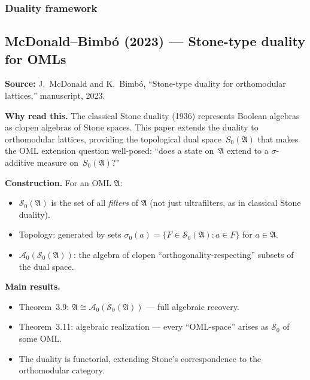 \subsubsection{Duality framework}

\subsection*{McDonald--Bimb\'{o} (2023) --- Stone-type duality for OMLs}

\textbf{Source:} J.\ McDonald and K.\ Bimb\'{o}, ``Stone-type duality
for orthomodular lattices,'' manuscript, 2023.

\textbf{Why read this.}  The classical Stone duality (1936) represents
Boolean algebras as clopen algebras of Stone spaces.  This paper extends
the duality to orthomodular lattices, providing the topological dual
space~$S_0(\mathfrak{A})$ that makes the OML extension question
well-posed: ``does a state on~$\mathfrak{A}$ extend to a
$\sigma$-additive measure on~$S_0(\mathfrak{A})$?''

\textbf{Construction.}  For an OML $\mathfrak{A}$:
\begin{itemize}[nosep]
  \item $\mathcal{S}_0(\mathfrak{A})$ is the set of all \emph{filters}
    of $\mathfrak{A}$ (not just ultrafilters, as in classical Stone
    duality).
  \item Topology: generated by sets $\sigma_0(a) = \{F \in
    \mathcal{S}_0(\mathfrak{A}) : a \in F\}$ for $a \in \mathfrak{A}$.
  \item $\mathcal{A}_0(\mathcal{S}_0(\mathfrak{A}))$: the algebra of
    clopen ``orthogonality-respecting'' subsets of the dual space.
\end{itemize}

\textbf{Main results.}
\begin{itemize}[nosep]
  \item Theorem~3.9: $\mathfrak{A} \cong
    \mathcal{A}_0(\mathcal{S}_0(\mathfrak{A}))$ --- full algebraic
    recovery.
  \item Theorem~3.11: algebraic realization --- every ``OML-space''
    arises as $\mathcal{S}_0$ of some OML.
  \item The duality is functorial, extending Stone's correspondence to
    the orthomodular category.
\end{itemize}

